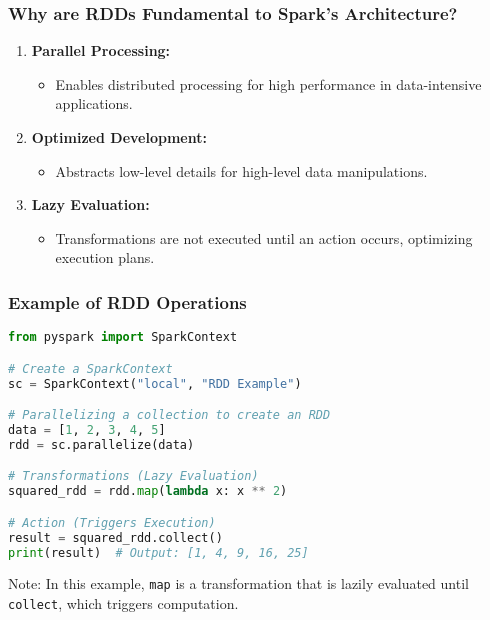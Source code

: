 \documentclass[aspectratio=169]{beamer}
\begin{document}
\begin{frame}[fragile]
    \frametitle{Why are RDDs Fundamental to Spark's Architecture?}
    \begin{enumerate}
        \item \textbf{Parallel Processing:} 
            \begin{itemize}
                \item Enables distributed processing for high performance in data-intensive applications.
            \end{itemize}
        \item \textbf{Optimized Development:} 
            \begin{itemize}
                \item Abstracts low-level details for high-level data manipulations.
            \end{itemize}
        \item \textbf{Lazy Evaluation:} 
            \begin{itemize}
                \item Transformations are not executed until an action occurs, optimizing execution plans.
            \end{itemize}
    \end{enumerate}
\end{frame}

\begin{frame}[fragile]
    \frametitle{Example of RDD Operations}
    \begin{lstlisting}[language=python]
from pyspark import SparkContext

# Create a SparkContext
sc = SparkContext("local", "RDD Example")

# Parallelizing a collection to create an RDD
data = [1, 2, 3, 4, 5]
rdd = sc.parallelize(data)

# Transformations (Lazy Evaluation)
squared_rdd = rdd.map(lambda x: x ** 2)

# Action (Triggers Execution)
result = squared_rdd.collect()
print(result)  # Output: [1, 4, 9, 16, 25]
    \end{lstlisting}
    \begin{block}{Note:}
        In this example, \texttt{map} is a transformation that is lazily evaluated until \texttt{collect}, which triggers computation.
    \end{block}
\end{frame}
\end{document}
